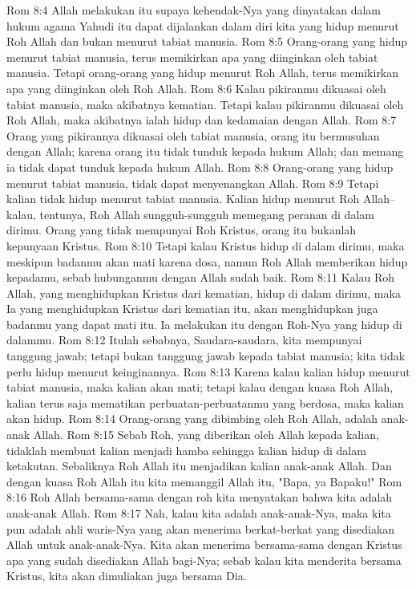 Rom 8:4  Allah melakukan itu supaya kehendak-Nya yang dinyatakan dalam hukum agama Yahudi itu dapat dijalankan dalam diri kita yang hidup menurut Roh Allah dan bukan menurut tabiat manusia.
Rom 8:5  Orang-orang yang hidup menurut tabiat manusia, terus memikirkan apa yang diinginkan oleh tabiat manusia. Tetapi orang-orang yang hidup menurut Roh Allah, terus memikirkan apa yang diinginkan oleh Roh Allah.
Rom 8:6  Kalau pikiranmu dikuasai oleh tabiat manusia, maka akibatnya kematian. Tetapi kalau pikiranmu dikuasai oleh Roh Allah, maka akibatnya ialah hidup dan kedamaian dengan Allah.
Rom 8:7  Orang yang pikirannya dikuasai oleh tabiat manusia, orang itu bermusuhan dengan Allah; karena orang itu tidak tunduk kepada hukum Allah; dan memang ia tidak dapat tunduk kepada hukum Allah.
Rom 8:8  Orang-orang yang hidup menurut tabiat manusia, tidak dapat menyenangkan Allah.
Rom 8:9  Tetapi kalian tidak hidup menurut tabiat manusia. Kalian hidup menurut Roh Allah--kalau, tentunya, Roh Allah sungguh-sungguh memegang peranan di dalam dirimu. Orang yang tidak mempunyai Roh Kristus, orang itu bukanlah kepunyaan Kristus.
Rom 8:10  Tetapi kalau Kristus hidup di dalam dirimu, maka meskipun badanmu akan mati karena dosa, namun Roh Allah memberikan hidup kepadamu, sebab hubunganmu dengan Allah sudah baik.
Rom 8:11  Kalau Roh Allah, yang menghidupkan Kristus dari kematian, hidup di dalam dirimu, maka Ia yang menghidupkan Kristus dari kematian itu, akan menghidupkan juga badanmu yang dapat mati itu. Ia melakukan itu dengan Roh-Nya yang hidup di dalammu.
Rom 8:12  Itulah sebabnya, Saudara-saudara, kita mempunyai tanggung jawab; tetapi bukan tanggung jawab kepada tabiat manusia; kita tidak perlu hidup menurut keinginannya.
Rom 8:13  Karena kalau kalian hidup menurut tabiat manusia, maka kalian akan mati; tetapi kalau dengan kuasa Roh Allah, kalian terus saja mematikan perbuatan-perbuatanmu yang berdosa, maka kalian akan hidup.
Rom 8:14  Orang-orang yang dibimbing oleh Roh Allah, adalah anak-anak Allah.
Rom 8:15  Sebab Roh, yang diberikan oleh Allah kepada kalian, tidaklah membuat kalian menjadi hamba sehingga kalian hidup di dalam ketakutan. Sebaliknya Roh Allah itu menjadikan kalian anak-anak Allah. Dan dengan kuasa Roh Allah itu kita memanggil Allah itu, "Bapa, ya Bapaku!"
Rom 8:16  Roh Allah bersama-sama dengan roh kita menyatakan bahwa kita adalah anak-anak Allah.
Rom 8:17  Nah, kalau kita adalah anak-anak-Nya, maka kita pun adalah ahli waris-Nya yang akan menerima berkat-berkat yang disediakan Allah untuk anak-anak-Nya. Kita akan menerima bersama-sama dengan Kristus apa yang sudah disediakan Allah bagi-Nya; sebab kalau kita menderita bersama Kristus, kita akan dimuliakan juga bersama Dia.
